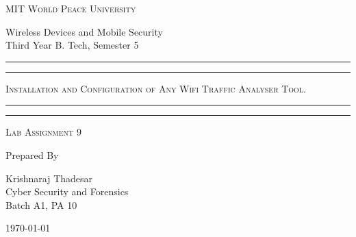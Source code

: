 \documentclass[11pt]{article}
\begin{document}
\begin{titlepage}
	\centering


	\huge\textsc{
		MIT World Peace University
	}\\

	\vspace{0.75\baselineskip} %

	\LARGE{
		Wireless Devices and Mobile Security\\
		Third Year B. Tech, Semester 5
	}

	\vfill %


	\rule{\textwidth}{1.6pt}\vspace*{-\baselineskip}\vspace*{2pt}
	\rule{\textwidth}{0.6pt}
	\vspace{0.75\baselineskip} %

	\huge{\textsc{
			Installation and Configuration of Any Wifi Traffic Analyser Tool.
		}} \\

	\vspace{0.5\baselineskip} %
	\rule{\textwidth}{0.6pt}\vspace*{-\baselineskip}\vspace*{2.8pt}
	\rule{\textwidth}{1.6pt}

	\vspace{1\baselineskip} %


	\LARGE\textsc{
		Lab Assignment 9
	} %
	\vfill


	Prepared By \vspace{0.5\baselineskip} %

	\Large{
		Krishnaraj Thadesar \\
		Cyber Security and Forensics\\
		Batch A1, PA 10
	}

	\vspace{0.5\baselineskip} %
	\today

\end{titlepage}
\end{document}
